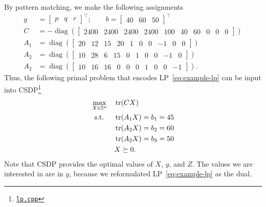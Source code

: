 \documentclass[a4paper]{article}
\DeclareMathOperator{\diag}{diag}
\begin{document}
By pattern matching, we make the following assignments
\begin{align*}
y &= \begin{bmatrix}p & q & r\end{bmatrix}^\top; \qquad b = \begin{bmatrix}40 & 60 & 50\end{bmatrix}^\top \\
C &= -\diag(\begin{bmatrix}2400 & 2400 & 2400 & 2400 & 100 & 40 & 60 & 0 & 0 & 0\end{bmatrix}) \\
A_1 &= \diag(\begin{bmatrix}20 & 12 & 15 & 20 & 1 & 0 & 0 & -1 & 0 & 0\end{bmatrix}) \\
A_2 &= \diag(\begin{bmatrix}10 & 28 & 6 & 15 & 0 & 1 & 0 & 0 & -1 & 0\end{bmatrix}) \\
A_2 &= \diag(\begin{bmatrix}10 & 16 & 16 & 0 & 0 & 0 & 1 & 0 & 0 & -1\end{bmatrix}).
\end{align*}
Thus, the following primal problem that encodes LP~\eqref{eq:example-lp} can be input into CSDP\footnote{\href{https://github.com/plusk01/tests/blob/master/csdp/src/lp.cpp}{\texttt{lp.cpp}}}
\begin{equation}
\begin{aligned}
\max_{X\in\mathbb{S}^n}                 \quad & \tr(CX) \\
\textrm{s.t. } \quad & \tr(A_1X) = b_1 = 45 \\
                     & \tr(A_2X) = b_2 = 60 \\
                     & \tr(A_2X) = b_3 = 50 \\
                     & X \succeq 0.
\end{aligned}
\end{equation}
Note that CSDP provides the optimal values of $X$, $y$, and $Z$.
The values we are interested in are in $y$, because we reformulated LP~\eqref{eq:example-lp} as the dual.



\end{document}
